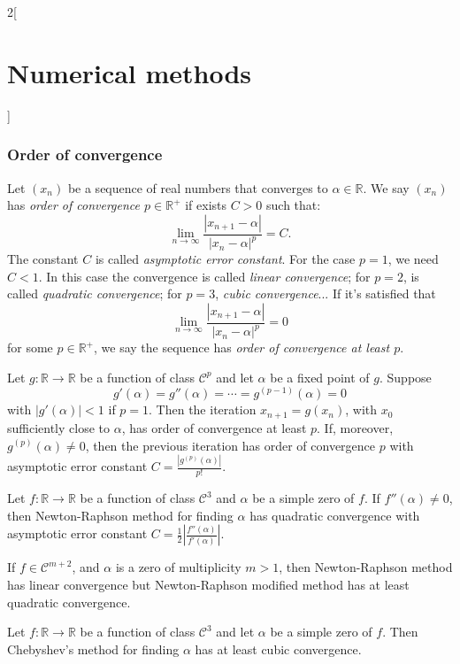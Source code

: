 \documentclass[class=article,10pt,crop=false]{standalone}
\begin{document}
\begin{multicols}{2}[\section{Numerical methods}]
\subsubsection*{Order of convergence}
\begin{definition}
Let $(x_n)$ be a sequence of real numbers that converges to $\alpha\in\mathbb{R}$. We say $(x_n)$ has \textit{order of convergence $p\in\mathbb{R}^+$} if exists $C>0$ such that: $$\lim_{n\to\infty}\frac{|x_{n+1}-\alpha|}{|x_n-\alpha|^p}=C.$$ The constant $C$ is called \textit{asymptotic error constant}. For the case $p=1$, we need $C<1$. In this case the convergence is called \textit{linear convergence}; for $p=2$, is called \textit{quadratic convergence}; for $p=3$, \textit{cubic convergence}... If it's satisfied that $$\lim_{n\to\infty}\frac{|x_{n+1}-\alpha|}{|x_n-\alpha|^p}=0$$ for some $p\in\mathbb{R}^+$, we say the sequence has \textit{order of convergence at least $p$}.
\end{definition}
\begin{theorem}
Let $g:\mathbb{R}\rightarrow\mathbb{R}$ be a function of class $\mathcal{C}^p$ and let $\alpha$ be a fixed point of $g$. Suppose $$g'(\alpha)=g''(\alpha)=\cdots=g^{(p-1)}(\alpha)=0$$ with $|g'(\alpha)|<1$ if $p=1$. Then the iteration $x_{n+1}=g(x_n)$, with $x_0$ sufficiently close to $\alpha$, has order of convergence at least $p$. If, moreover, $g^{(p)}(\alpha)\ne0$, then the previous iteration has order of convergence $p$ with asymptotic error constant $C=\frac{|g^{(p)}(\alpha)|}{p!}$.
\end{theorem}
\begin{theorem}
Let $f:\mathbb{R}\rightarrow\mathbb{R}$ be a function of class $\mathcal{C}^3$ and $\alpha$ be a simple zero of $f$. If $f''(\alpha)\ne0$, then Newton-Raphson method for finding $\alpha$ has quadratic convergence with asymptotic error constant $C=\frac{1}{2}\left|\frac{f''(\alpha)}{f'(\alpha)}\right|$.\par If $f\in\mathcal{C}^{m+2}$, and $\alpha$ is a zero of multiplicity $m>1$, then Newton-Raphson method has linear convergence but Newton-Raphson modified method has at least quadratic convergence.
\end{theorem}
\begin{theorem}
Let $f:\mathbb{R}\rightarrow\mathbb{R}$ be a function of class $\mathcal{C}^3$ and let $\alpha$ be a simple zero of $f$. Then Chebyshev's method for finding $\alpha$ has at least cubic convergence.
\end{theorem}
\begin{definition}

\end{definition}
\end{multicols}
\end{document}
